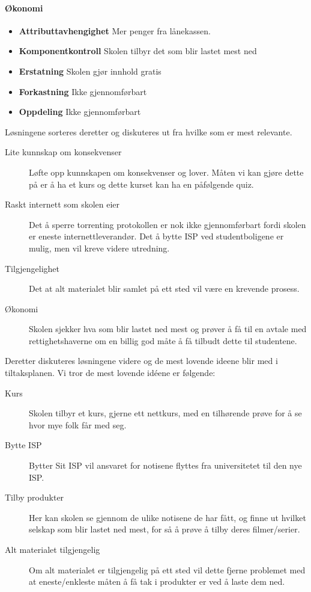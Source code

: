 \paragraph{Økonomi}
\begin{itemize}
    \item \textbf{Attributtavhengighet} Mer penger fra lånekassen. 
    \item \textbf{Komponentkontroll} Skolen tilbyr det som blir lastet mest ned
    \item \textbf{Erstatning} Skolen gjør innhold gratis
    \item \textbf{Forkastning} Ikke gjennomførbart
    \item \textbf{Oppdeling} Ikke gjennomførbart
\end{itemize}

Løsningene sorteres deretter og diskuteres ut fra hvilke som er mest relevante. 

\begin{description}
    \item[Lite kunnskap om konsekvenser] Løfte opp kunnskapen om konsekvenser og lover.  Måten vi kan gjøre dette på er å ha et kurs og dette kurset kan ha en påfølgende quiz.
    \item[Raskt internett som skolen eier] Det å sperre torrenting protokollen er nok ikke gjennomførbart fordi skolen er eneste internettleverandør. Det å bytte ISP ved studentboligene er mulig, men vil kreve videre utredning.
    \item[Tilgjengelighet] Det at alt materialet blir samlet på ett sted vil være en krevende prosess.
    \item[Økonomi] Skolen sjekker hva som blir lastet ned mest og prøver å få til en avtale med rettighetshaverne om en billig god måte å få tilbudt dette til studentene.
\end{description}

Deretter diskuteres løsningene videre og de mest lovende ideene blir med i tiltaksplanen. Vi tror de mest lovende idéene er følgende:

\begin{description}
    \item [Kurs] Skolen tilbyr et kurs, gjerne ett nettkurs, med en tilhørende prøve for å se hvor mye folk får med seg.
    \item [Bytte ISP] Bytter Sit ISP vil ansvaret for notisene flyttes fra universitetet til den nye ISP. 
    \item [Tilby produkter] Her kan skolen se gjennom de ulike notisene de har fått, og finne ut hvilket selskap som blir lastet ned mest, for så å prøve å tilby deres filmer/serier.
    \item [Alt materialet tilgjengelig] Om alt materialet er tilgjengelig på ett sted vil dette fjerne problemet med at eneste/enkleste måten å få tak i produkter er ved å laste dem ned.
\end{description}

